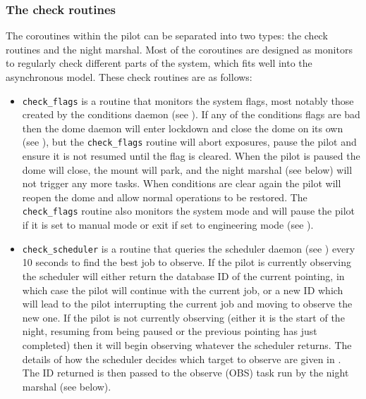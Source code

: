 \begin{colsection}
\begin{colsection}
\subsubsection{The check routines}

The coroutines within the pilot can be separated into two types: the check routines and the night marshal. Most of the coroutines are designed as monitors to regularly check different parts of the system, which fits well into the asynchronous model. These check routines are as follows:

\begin{itemize}

\item \texttt{check\_flags} is a routine that monitors the system flags, most notably those created by the conditions daemon (see ). If any of the conditions flags are bad then the dome daemon will enter lockdown and close the dome on its own (see ), but the \texttt{check\_flags} routine will abort exposures, pause the pilot and ensure it is not resumed until the flag is cleared. When the pilot is paused the dome will close, the mount will park, and the night marshal (see below) will not trigger any more tasks. When conditions are clear again the pilot will reopen the dome and allow normal operations to be restored. The \texttt{check\_flags} routine also monitors the system mode and will pause the pilot if it is set to manual mode or exit if set to engineering mode (see ).

\item \texttt{check\_scheduler} is a routine that queries the scheduler daemon (see ) every 10 seconds to find the best job to observe. If the pilot is currently observing the scheduler will either return the database ID of the current pointing, in which case the pilot will continue with the current job, or a new ID which will lead to the pilot interrupting the current job and moving to observe the new one. If the pilot is not currently observing (either it is the start of the night, resuming from being paused or the previous pointing has just completed) then it will begin observing whatever the scheduler returns. The details of how the scheduler decides which target to observe are given in . The ID returned is then passed to the observe (OBS) task run by the night marshal (see below).


\end{itemize}
\end{colsection}
\end{colsection}
